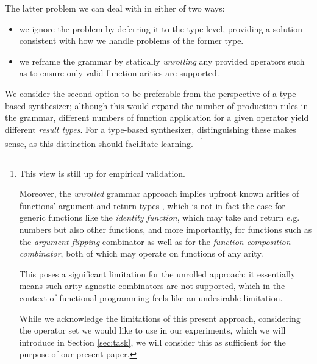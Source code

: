 \documentclass{article}
\begin{document}
The latter problem we can deal with in either of two ways:
\begin{itemize}
    \item we ignore the problem by deferring it to the type-level,
    providing a solution consistent with how we handle problems of the former type.
    \item we reframe the grammar by statically \emph{unrolling} any provided operators such as to ensure only valid function arities are supported.
\end{itemize}

We consider the second option to be preferable from the perspective of a type-based synthesizer;
although this would expand the number of production rules in the grammar,
different numbers of function application for a given operator yield different \emph{result types}.
For a type-based synthesizer, distinguishing these makes sense,
as this distinction should facilitate learning.%
~\footnote{
    This view is still up for empirical validation.

    Moreover, the \emph{unrolled} grammar approach implies upfront known arities of functions' argument and return types%
    ,
    which is not in fact the case for generic functions like the \emph{identity function},
    which may take and return e.g. numbers but also other functions,
    and more importantly, for functions such as the \emph{argument flipping} combinator
    as well as for the \emph{function composition combinator},
    both of which may operate on functions of any arity.

    This poses a significant limitation for the unrolled approach:
    it essentially means such arity-agnostic combinators are not supported,
    which in the context of functional programming feels like an undesirable limitation.

    While we acknowledge the limitations of this present approach,
    considering the operator set we would like to use in our experiments,
    which we will introduce in Section \ref{sec:task},
    we will consider this as sufficient for the purpose of our present paper.

}
\end{document}

